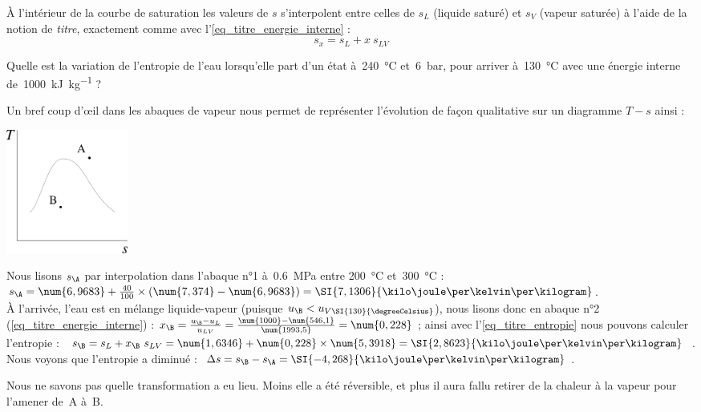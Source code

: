 	
		À l’intérieur de la courbe de saturation les valeurs de $s$ s’interpolent entre celles de $s_L$ (liquide saturé) et $s_V$ (vapeur saturée) à l’aide de la notion de \emph{titre}, exactement comme avec l’\cref{eq_titre_energie_interne} :
		\begin{equation}
			s_x = s_L + x \ s_{LV}
			\label{eq_titre_entropie}
		\end{equation}
	
		\clearfloats
		\begin{anexample}
			Quelle est la variation de l’entropie de l’eau lorsqu’elle part d’un état à~\SI{240}{\degreeCelsius} et~\SI{6}{\bar}, pour arriver à~\SI{130}{\degreeCelsius} avec une énergie interne de~\SI{1000}{\kilo\joule\per\kilogram} ?%
			
				\begin{answer}
					Un bref coup d’œil dans les abaques de vapeur nous permet de représenter l’évolution de façon qualitative sur un diagramme $T-s$ ainsi :
						\begin{center}\includegraphics[width=4cm]{images/exe_ts_4.png}\end{center}
					Nous lisons $s_\A$ par interpolation dans l’abaque n°1 à~\SI{0,6}{\mega\pascal} entre \SI{200}{\degreeCelsius} et~\SI{300}{\degreeCelsius} : $s_\A= \num{6,9683} + \frac{40}{100}\times(\num{7,374}-\num{6,9683}) = \SI{7,1306}{\kilo\joule\per\kelvin\per\kilogram} $.\\
					À l’arrivée, l’eau est en mélange liquide-vapeur (puisque $u_\B<u_{V\SI{130}{\degreeCelsius}}$), nous lisons donc en abaque n°2 (\ref{eq_titre_energie_interne}) : $x_\B = \frac{u_\B - u_L}{u_{LV}} = \frac{\num{1000}-\num{546,1}}{\num{1993,5}}= \num{0,228} $ ; ainsi avec l’\cref{eq_titre_entropie} nous pouvons calculer l’entropie : $s_\B= s_L + x_\B \ s_{LV} = \num{1,6346}+ \num{0,228}\times\num{5,3918} = \SI{2,8623}{\kilo\joule\per\kelvin\per\kilogram}$.\\
					Nous voyons que l’entropie a diminué : $\Delta s = s_\B - s_\A = \SI{-4,268}{\kilo\joule\per\kelvin\per\kilogram} $.
				
				\begin{remark}Nous ne savons pas quelle transformation a eu lieu. Moins elle a été réversible, et plus il aura fallu retirer de la chaleur à la vapeur pour l’amener de~A à~B.\end{remark}\end{answer}
		\end{anexample}

